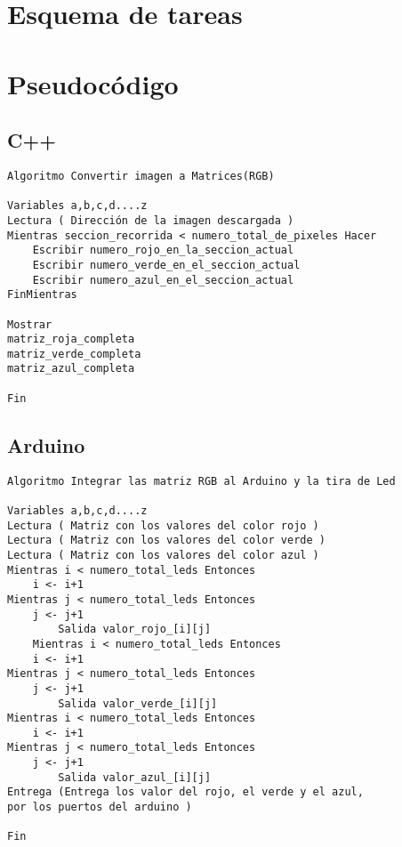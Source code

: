 \documentclass{article}
\begin{document}
\section{Esquema de tareas} \label{contenido}
\begin{center}
\begin{minipage}[c]{1\textwidth}
\end{minipage}
\end{center}
\section{Pseudocódigo} \label{contenido}
\subsection{C++}
\begin{lstlisting}
Algoritmo Convertir imagen a Matrices(RGB)

Variables a,b,c,d....z
Lectura ( Dirección de la imagen descargada )
Mientras seccion_recorrida < numero_total_de_pixeles Hacer
	Escribir numero_rojo_en_la_seccion_actual
	Escribir numero_verde_en_el_seccion_actual 
	Escribir numero_azul_en_el_seccion_actual
FinMientras

Mostrar
matriz_roja_completa
matriz_verde_completa
matriz_azul_completa

Fin
\end{lstlisting}
\subsection{Arduino}
\begin{lstlisting}
Algoritmo Integrar las matriz RGB al Arduino y la tira de Led

Variables a,b,c,d....z
Lectura ( Matriz con los valores del color rojo )
Lectura ( Matriz con los valores del color verde )
Lectura ( Matriz con los valores del color azul )
Mientras i < numero_total_leds Entonces
	i <- i+1
Mientras j < numero_total_leds Entonces
	j <- j+1
		Salida valor_rojo_[i][j]
	Mientras i < numero_total_leds Entonces
	i <- i+1
Mientras j < numero_total_leds Entonces
	j <- j+1
		Salida valor_verde_[i][j]
Mientras i < numero_total_leds Entonces
	i <- i+1
Mientras j < numero_total_leds Entonces
	j <- j+1
		Salida valor_azul_[i][j]
Entrega (Entrega los valor del rojo, el verde y el azul, 
por los puertos del arduino )

Fin
\end{lstlisting}
\end{document}
